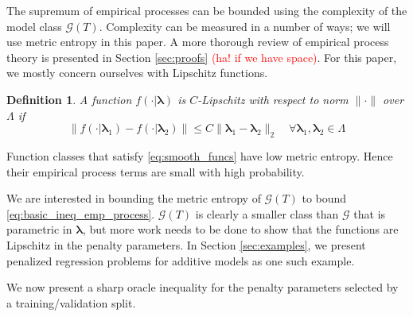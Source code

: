 \documentclass[12pt]{article}
\newtheorem{definition}{Definition}
\begin{document}
The supremum of empirical processes can be bounded using the complexity of the model class $\mathcal{G}(T)$. Complexity can be measured in a number of ways; we will use metric entropy in this paper. A more thorough review of empirical process theory is presented in Section \ref{sec:proofs} \textcolor{red}{(ha! if we have space)}. For this paper, we mostly concern ourselves with Lipschitz functions.
\begin{definition}
\label{def:smooth_funcs}
A function $f(\cdot | \boldsymbol{\lambda})$ is $C$-Lipschitz with respect to norm $\| \cdot \|$ over $\Lambda$ if
\begin{equation}
\left \| f(\cdot | \boldsymbol \lambda_1) - f(\cdot | \boldsymbol \lambda_2) \right \|
\le
C \| \boldsymbol \lambda_1 - \boldsymbol \lambda_2 \|_2 
\quad
\forall \boldsymbol \lambda_1,\boldsymbol \lambda_2 \in \Lambda
\label{eq:smooth_funcs}
\end{equation}
\end{definition}
Function classes that satisfy \eqref{eq:smooth_funcs} have low metric entropy. Hence their empirical process terms are small with high probability.

We are interested in bounding the metric entropy of $\mathcal{G}(T)$ to bound \eqref{eq:basic_ineq_emp_process}. $\mathcal{G}(T)$ is clearly a smaller class than $\mathcal{G}$ that is parametric in $\boldsymbol{\lambda}$, but more work needs to be done to show that the functions are Lipschitz in the penalty parameters. In Section \ref{sec:examples}, we present  penalized regression problems for additive models as one such example.

We now present a sharp oracle inequality for the penalty parameters selected by a training/validation split.
\end{document}
